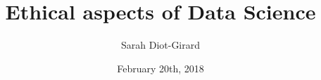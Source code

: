 \documentclass{beamer}
\begin{document}
\title{Ethical aspects of Data Science}
\author{Sarah Diot-Girard}
\date{February 20th, 2018}


\begingroup
\begin{frame}
  \titlepage
\end{frame}
\endgroup

\end{document}
